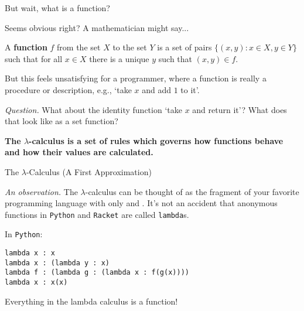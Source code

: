 \documentclass[10pt]{beamer}
\begin{document}
\begin{frame}{But wait, what is a function?}

Seems obvious right? A mathematician might say...

\begin{definition}
A \textbf{function} $f$ from the set $X$ to the set $Y$ is a set of pairs $\{(x, y) : x \in X, y \in Y\}$ such that for all $x \in X$ there is a unique $y$ such that $(x, y) \in f$.
\end{definition}
\nxt

But this feels unsatisfying for a programmer, where a function is really a procedure or description, e.g., `take $x$ and add $1$ to it'.
\nxt

\textit{Question.} What about the identity function `take $x$ and return it'? What does that look like as a set function?
\nxt

\textbf{The $\lambda$-calculus is a set of rules which governs how functions  behave and how their values are calculated.}

\end{frame}

\begin{frame}[fragile]{The $\lambda$-Calculus (A First Approximation)}

\textit{An observation.} The $\lambda$-calculus can be thought of as the fragment of your favorite programming language with only  and . It's not an accident that anonymous functions in \texttt{Python} and \texttt{Racket} are called \texttt{lambda}s.
\nxt

In \texttt{Python}:

\begin{verbatim}
lambda x : x
lambda x : (lambda y : x)
lambda f : (lambda g : (lambda x : f(g(x))))
lambda x : x(x)
\end{verbatim}
\nxt

\begin{important}
Everything in the lambda calculus is a function!
\end{important}
\end{frame}
\end{document}
